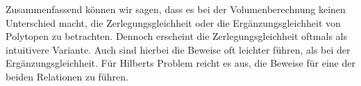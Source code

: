 \documentclass[11pt,titlepage]{article}
\theoremstyle{definition}
\theoremstyle{remark}
\begin{document}
	Zusammenfassend können wir sagen, dass es bei der Volumenberechnung 
	keinen Unterschied macht, die Zerlegungsgleichheit oder die 
	Ergänzungsgleichheit von Polytopen zu betrachten. Dennoch erscheint die 
	Zerlegungsgleichheit oftmals als intuitivere Variante. Auch sind hierbei 
	die Beweise oft leichter führen, als bei der Ergänzungsgleichheit. 
	Für Hilberts Problem reicht es aus, die Beweise für eine 
	der beiden Relationen zu führen.

	\newpage
	
	
\end{document}

